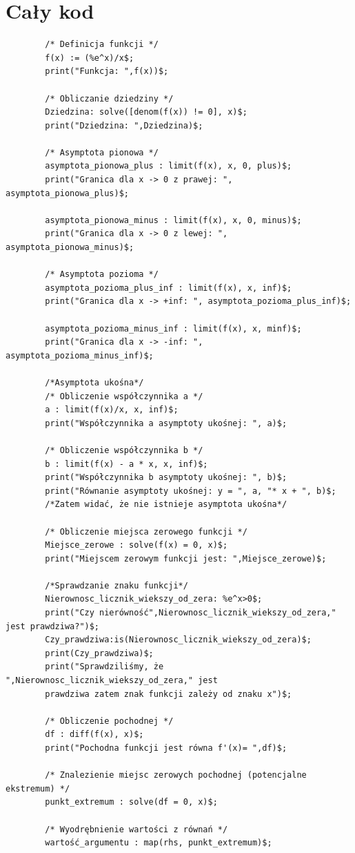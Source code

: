 \documentclass[]{article}
\begin{document}
	\section{Cały kod}
	\begin{verbatim}
		/* Definicja funkcji */
		f(x) := (%e^x)/x$;
		print("Funkcja: ",f(x))$;
		
		/* Obliczanie dziedziny */
		Dziedzina: solve([denom(f(x)) != 0], x)$;
		print("Dziedzina: ",Dziedzina)$;
		
		/* Asymptota pionowa */
		asymptota_pionowa_plus : limit(f(x), x, 0, plus)$;
		print("Granica dla x -> 0 z prawej: ", asymptota_pionowa_plus)$;
		
		asymptota_pionowa_minus : limit(f(x), x, 0, minus)$;
		print("Granica dla x -> 0 z lewej: ", asymptota_pionowa_minus)$;
		
		/* Asymptota pozioma */
		asymptota_pozioma_plus_inf : limit(f(x), x, inf)$;
		print("Granica dla x -> +inf: ", asymptota_pozioma_plus_inf)$;
		
		asymptota_pozioma_minus_inf : limit(f(x), x, minf)$;
		print("Granica dla x -> -inf: ", asymptota_pozioma_minus_inf)$;
		
		/*Asymptota ukośna*/
		/* Obliczenie współczynnika a */
		a : limit(f(x)/x, x, inf)$;
		print("Współczynnika a asymptoty ukośnej: ", a)$;
		
		/* Obliczenie współczynnika b */
		b : limit(f(x) - a * x, x, inf)$;
		print("Współczynnika b asymptoty ukośnej: ", b)$;
		print("Równanie asymptoty ukośnej: y = ", a, "* x + ", b)$;
		/*Zatem widać, że nie istnieje asymptota ukośna*/
		
		/* Obliczenie miejsca zerowego funkcji */
		Miejsce_zerowe : solve(f(x) = 0, x)$;
		print("Miejscem zerowym funkcji jest: ",Miejsce_zerowe)$;
		
		/*Sprawdzanie znaku funkcji*/
		Nierownosc_licznik_wiekszy_od_zera: %e^x>0$;
		print("Czy nierówność",Nierownosc_licznik_wiekszy_od_zera," jest prawdziwa?")$;
		Czy_prawdziwa:is(Nierownosc_licznik_wiekszy_od_zera)$;
		print(Czy_prawdziwa)$;
		print("Sprawdziliśmy, że ",Nierownosc_licznik_wiekszy_od_zera," jest
		prawdziwa zatem znak funkcji zależy od znaku x")$;
		
		/* Obliczenie pochodnej */
		df : diff(f(x), x)$;
		print("Pochodna funkcji jest równa f'(x)= ",df)$;
		
		/* Znalezienie miejsc zerowych pochodnej (potencjalne ekstremum) */
		punkt_extremum : solve(df = 0, x)$;
		
		/* Wyodrębnienie wartości z równań */
		wartość_argumentu : map(rhs, punkt_extremum)$;
		

\end{verbatim}
\end{document}
